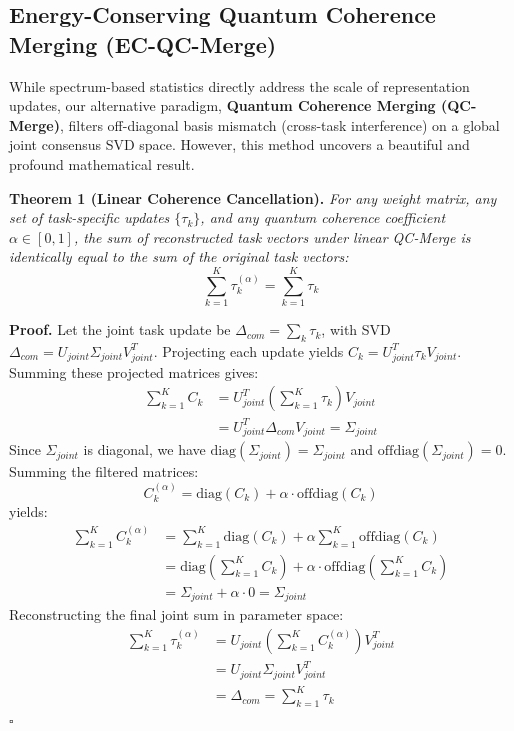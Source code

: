 \documentclass{article}
\theoremstyle{plain}
\theoremstyle{definition}
\theoremstyle{remark}
\begin{document}
\subsection{Energy-Conserving Quantum Coherence Merging (EC-QC-Merge)}
While spectrum-based statistics directly address the scale of representation updates, our alternative paradigm, \textbf{Quantum Coherence Merging (QC-Merge)}, filters off-diagonal basis mismatch (cross-task interference) on a global joint consensus SVD space. However, this method uncovers a beautiful and profound mathematical result.

\textbf{Theorem 1 (Linear Coherence Cancellation).} \textit{For any weight matrix, any set of task-specific updates $\{\tau_k\}$, and any quantum coherence coefficient $\alpha \in [0, 1]$, the sum of reconstructed task vectors under linear QC-Merge is identically equal to the sum of the original task vectors:}
\begin{equation}
    \sum_{k=1}^K \tau_k^{(\alpha)} = \sum_{k=1}^K \tau_k
\end{equation}

\textbf{Proof.} Let the joint task update be $\Delta_{com} = \sum_k \tau_k$, with SVD $\Delta_{com} = U_{joint} \Sigma_{joint} V_{joint}^T$. Projecting each update yields $C_k = U_{joint}^T \tau_k V_{joint}$. Summing these projected matrices gives:
\begin{align}
    \sum_{k=1}^K C_k &= U_{joint}^T \left( \sum_{k=1}^K \tau_k \right) V_{joint} \nonumber \\
    &= U_{joint}^T \Delta_{com} V_{joint} = \Sigma_{joint}
\end{align}
Since $\Sigma_{joint}$ is diagonal, we have $\text{diag}(\Sigma_{joint}) = \Sigma_{joint}$ and $\text{offdiag}(\Sigma_{joint}) = 0$. Summing the filtered matrices:
\begin{equation}
    C_k^{(\alpha)} = \text{diag}(C_k) + \alpha \cdot \text{offdiag}(C_k)
\end{equation}
yields:
\begin{align}
    \sum_{k=1}^K C_k^{(\alpha)} &= \sum_{k=1}^K \text{diag}(C_k) + \alpha \sum_{k=1}^K \text{offdiag}(C_k) \nonumber \\
    &= \text{diag}\left(\sum_{k=1}^K C_k\right) + \alpha \cdot \text{offdiag}\left(\sum_{k=1}^K C_k\right) \nonumber \\
    &= \Sigma_{joint} + \alpha \cdot 0 = \Sigma_{joint}
\end{align}
Reconstructing the final joint sum in parameter space:
\begin{align}
    \sum_{k=1}^K \tau_k^{(\alpha)} &= U_{joint} \left( \sum_{k=1}^K C_k^{(\alpha)} \right) V_{joint}^T \nonumber \\
    &= U_{joint} \Sigma_{joint} V_{joint}^T \nonumber \\
    &= \Delta_{com} = \sum_{k=1}^K \tau_k
\end{align}
\hfill$\square$
\end{document}
